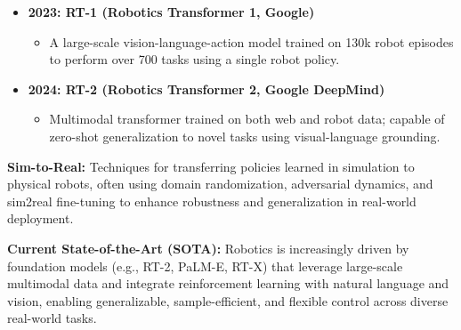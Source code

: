 \documentclass{article}
\begin{document}
\begin{itemize}[leftmargin=1.5em]
\begin{itemize}
  \end{itemize}
\item \textbf{2023: RT-1 (Robotics Transformer 1, Google)}
  \begin{itemize}
    \item A large-scale vision-language-action model trained on 130k robot episodes to perform over 700 tasks using a single robot policy.
  \end{itemize}
\item \textbf{2024: RT-2 (Robotics Transformer 2, Google DeepMind)}
  \begin{itemize}
    \item Multimodal transformer trained on both web and robot data; capable of zero-shot generalization to novel tasks using visual-language grounding.
  \end{itemize}
\end{itemize}

\textbf{Sim-to-Real:} Techniques for transferring policies learned in simulation to physical robots, often using domain randomization, adversarial dynamics, and sim2real fine-tuning to enhance robustness and generalization in real-world deployment.



\textbf{Current State-of-the-Art (SOTA):} Robotics is increasingly driven by foundation models (e.g., RT-2, PaLM-E, RT-X) that leverage large-scale multimodal data and integrate reinforcement learning with natural language and vision, enabling generalizable, sample-efficient, and flexible control across diverse real-world tasks.
\end{document}
